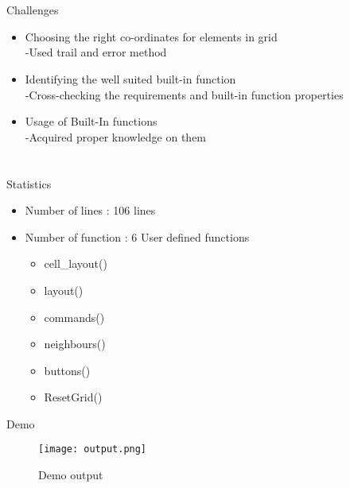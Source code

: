 \documentclass{beamer}
\begin{document}
\section{}
\begin{frame}
{\huge Challenges}
\begin{itemize}
\item Choosing the right co-ordinates for elements in  grid\\ { \;-Used trail and error method}
\item Identifying the well suited built-in function \\ {\;-Cross-checking the requirements and built-in function properties}
\item Usage of Built-In functions \\ {\;-Acquired proper knowledge on them}
\end{itemize}
\end{frame}

\section{}

\begin{frame}{\huge Statistics}
\begin{itemize}
\item Number of lines : 106 lines
\item Number of function : 6 User defined functions
\begin{itemize}
\item cell\_layout()
\item layout()
\item commands()
\item neighbours()
\item buttons()
\item ResetGrid()
\end{itemize}
\end {itemize}
\end{frame}
\begin{frame}{\huge Demo}
\begin{figure}[C:\Users\Adithya\Desktop]
    \centering
    \texttt{[image: output.png]}
    \caption{Demo output}
    \label{fig:demo1}
\end{figure}
\end{frame}

\subsection{}
\begin{frame}
\end{frame}
\end{document}
